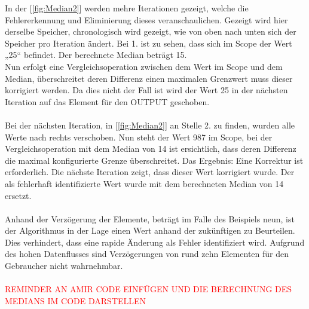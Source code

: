 \documentclass[titlepage,12pt,twoside]{article}
\begin{document}
\hfill \break
In der [\textcolor{blue}{\autoref{fig:Median2}}] werden mehre Iterationen gezeigt, welche die Fehlererkennung und Eliminierung dieses veranschaulichen. Gezeigt wird hier derselbe 
Speicher, chronologisch wird gezeigt, wie von oben nach unten sich der Speicher pro Iteration ändert. Bei 1. ist zu sehen, dass sich im Scope der Wert 
„25“ befindet. Der berechnete Median beträgt 15. \\
Nun erfolgt eine Vergleichsoperation zwischen dem Wert im Scope und dem Median, überschreitet deren Differenz einen maximalen Grenzwert muss dieser 
korrigiert werden. Da dies nicht der Fall ist wird der Wert 25 in der nächsten Iteration auf das Element für den OUTPUT geschoben. \\
\\
Bei der nächsten Iteration, in [\textcolor{blue}{\autoref{fig:Median2}}] an Stelle 2. zu finden, wurden alle Werte nach rechts verschoben. Nun steht der Wert 987 im Scope, bei der 
Vergleichsoperation mit dem Median von 14 ist ersichtlich, dass deren Differenz die maximal konfigurierte Grenze überschreitet. Das Ergebnis: Eine 
Korrektur ist erforderlich. Die nächste Iteration zeigt, dass dieser Wert korrigiert wurde. Der als fehlerhaft identifizierte Wert wurde mit dem 
berechneten Median von 14 ersetzt. \\ 
\\
Anhand der Verzögerung der Elemente, beträgt im Falle des Beispiels neun, ist der Algorithmus in der Lage einen Wert anhand der zukünftigen zu Beurteilen. 
Dies verhindert, dass eine rapide Änderung als Fehler identifiziert wird. Aufgrund des hohen Datenflusses sind Verzögerungen von rund zehn Elementen für 
den Gebraucher nicht wahrnehmbar. \\
\\
\textcolor{red}{REMINDER AN AMIR CODE EINFÜGEN UND DIE BERECHNUNG DES MEDIANS IM CODE DARSTELLEN} \\
\\
\end{document}
